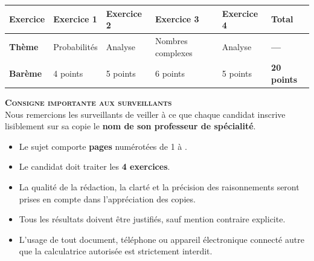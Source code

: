 \documentclass[12pt,a4paper]{article}
\begin{document}
\vfill

\begin{center}
\renewcommand{\arraystretch}{1.5}
\begin{tabularx}{0.96\textwidth}{|>{\centering\arraybackslash\bfseries}m{2.6cm}|*{4}{Y|}>{\centering\arraybackslash\bfseries}m{2.2cm}|}
    \hline
    Exercice & \textbf{Exercice 1} & \textbf{Exercice 2} & \textbf{Exercice 3} & \textbf{Exercice 4} & \textbf{Total} \\ \hline
    Thème    & Probabilités & Analyse & Nombres complexes & Analyse & --- \\ \hline
    Barème   & 4 points & 5 points & 6 points & 5 points & 20 points \\ \hline
\end{tabularx}
\end{center}

\vfill

\begin{center}
\begin{tcolorbox}[colback=gray!5, colframe=black, boxrule=1pt, arc=1mm, width=0.96\textwidth, top=3mm, bottom=3mm, left=4mm, right=4mm]
    \centering
    \textbf{\textsc{Consigne importante aux surveillants}}\\[0.15cm]
    \normalsize
    Nous remercions les surveillants de veiller à ce que chaque candidat inscrive lisiblement sur sa copie le \textbf{nom de son professeur de spécialité}.
\end{tcolorbox}
\end{center}

\vfill

\begin{tcolorbox}[colback=white, colframe=black, arc=0mm, boxrule=0.8pt, title=\textbf{\textsc{Consignes aux candidats}}, coltitle=black, colbacktitle=gray!15, top=3mm, bottom=3mm, left=4mm, right=4mm]
    \small
    \begin{itemize}[leftmargin=1.5em, itemsep=0.25em, label=---]
        \item Le sujet comporte \textbf{\pageref{LastPage} pages} numérotées de 1 à \pageref{LastPage}.
        \item Le candidat doit traiter les \textbf{4 exercices}.
        \item La qualité de la rédaction, la clarté et la précision des raisonnements seront prises en compte dans l'appréciation des copies.
        \item Tous les résultats doivent être justifiés, sauf mention contraire explicite.
        \item L'usage de tout document, téléphone ou appareil électronique connecté autre que la calculatrice autorisée est strictement interdit.
    \end{itemize}
\end{tcolorbox}
\end{document}
